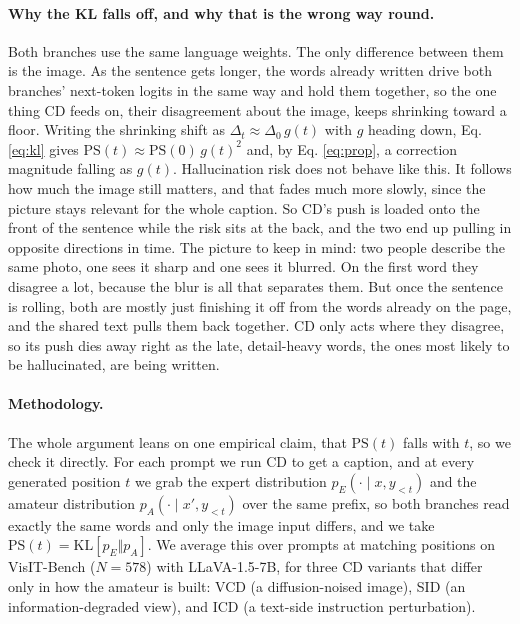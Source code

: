 \documentclass[11pt]{article}
\begin{document}
\paragraph{Why the KL falls off, and why that is the wrong way round.}
Both branches use the same language weights. The only difference between them is the
image. As the sentence gets longer, the words already written drive both branches'
next-token logits in the same way and hold them together, so the one thing CD feeds
on, their disagreement about the image, keeps shrinking toward a floor. Writing the
shrinking shift as $\Delta_t\approx\Delta_0\,g(t)$ with $g$ heading down, Eq.
\eqref{eq:kl} gives $\mathrm{PS}(t)\approx\mathrm{PS}(0)\,g(t)^2$ and, by Eq.
\eqref{eq:prop}, a correction magnitude falling as $g(t)$. Hallucination risk does
not behave like this. It follows how much the image still matters, and that fades
much more slowly, since the picture stays relevant for the whole caption. So CD's
push is loaded onto the front of the sentence while the risk sits at the back, and
the two end up pulling in opposite directions in time. The picture to keep in mind:
two people describe the same photo, one sees it sharp and one sees it blurred. On
the first word they disagree a lot, because the blur is all that separates them. But
once the sentence is rolling, both are mostly just finishing it off from the words
already on the page, and the shared text pulls them back together. CD only acts
where they disagree, so its push dies away right as the late, detail-heavy words,
the ones most likely to be hallucinated, are being written.

\paragraph{Methodology.}
The whole argument leans on one empirical claim, that $\mathrm{PS}(t)$ falls with
$t$, so we check it directly. For each prompt we run CD to get a caption, and at
every generated position $t$ we grab the expert distribution $p_E(\cdot\mid x,
y_{<t})$ and the amateur distribution $p_A(\cdot\mid x',y_{<t})$ over the same
prefix, so both branches read exactly the same words and only the image input
differs, and we take $\mathrm{PS}(t)=\mathrm{KL}[p_E\Vert p_A]$. We average this
over prompts at matching positions on VisIT-Bench ($N=578$) with LLaVA-1.5-7B, for
three CD variants that differ only in how the amateur is built: VCD (a
diffusion-noised image), SID (an information-degraded view), and ICD (a text-side
instruction perturbation).
\end{document}
